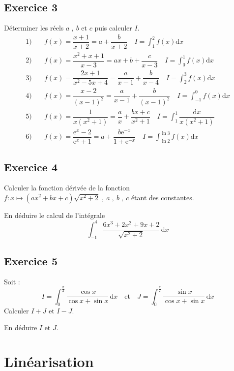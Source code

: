 \documentclass[12pt]{article}
\begin{document}
\subsection*{Exercice 3}
Déterminer les réels $a\;,\ b\text{ et }c$ puis calculer $I$.
\begin{align*}
1) & \quad f(x)=\dfrac{x+1}{x+2}=a+\dfrac{b}{x+2} \quad I=\int_{1}^{2}f(x)\mathrm{d}x \\
2) & \quad f(x)=\dfrac{x^{2}+x+1}{x-3}=ax+b+\dfrac{c}{x-3} \quad I=\int_{0}^{1}f(x)\mathrm{d}x \\
3) & \quad f(x)=\dfrac{2x+1}{x^{2}-5x+4}=\dfrac{a}{x-1}+\dfrac{b}{x-4} \quad I=\int_{2}^{3}f(x)\mathrm{d}x \\
4) & \quad f(x)=\dfrac{x-2}{(x-1)^{2}}=\dfrac{a}{x-1}+\dfrac{b}{(x-1)^{2}} \quad I=\int_{-1}^{0}f(x)\mathrm{d}x \\
5) & \quad f(x)=\dfrac{1}{x(x^{2}+1)}=\dfrac{a}{x}+\dfrac{bx+c}{x^{2}+1} \quad I=\int_{1}^{1}\dfrac{\mathrm{d}x}{x(x^{2}+1)} \\
6) & \quad f(x)=\dfrac{\mathrm{e}^{x}-2}{\mathrm{e}^{x}+1}=a+\dfrac{b\mathrm{e}^{-x}}{1+\mathrm{e}^{-x}} \quad I=\int_{\ln2}^{\ln3}f(x)\mathrm{d}x
\end{align*}

\subsection*{Exercice 4}
Calculer la fonction dérivée de la fonction $f: x \mapsto (ax^{2}+bx+c)\sqrt{x^{2}+2}\;,\ a\;,\ b\;,\ c$ étant des constantes.

En déduire le calcul de l'intégrale 
\[
\int_{-1}^{4}\frac{6x^{3}+2x^{2}+9x+2}{\sqrt{x^{2}+2}}\,\mathrm{d}x
\]

\subsection*{Exercice 5}
Soit :
\[
I = \int_{0}^{\frac{\pi}{2}}\frac{\cos x}{\cos x+\sin x}\,\mathrm{d}x\quad \text{et}\quad J = \int_{0}^{\frac{\pi}{2}}\frac{\sin x}{\cos x+\sin x}\,\mathrm{d}x
\]
Calculer $I + J$ et $I - J$.

En déduire $I$ et $J$.

\section*{Linéarisation}
\end{document}
